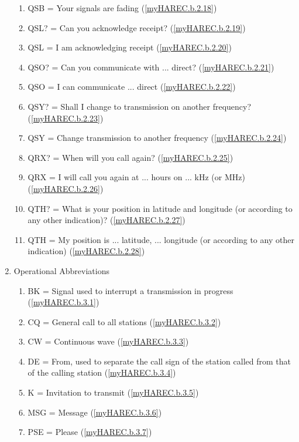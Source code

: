 \begin{enumerate}[noitemsep]
\begin{enumerate}[noitemsep]
\item QSB  = Your signals are fading (\ref{myHAREC.b.2.18})\label{HAREC.b.2.18}
\item QSL? = Can you acknowledge receipt? (\ref{myHAREC.b.2.19})\label{HAREC.b.2.19}
\item QSL  = I am acknowledging receipt (\ref{myHAREC.b.2.20})\label{HAREC.b.2.20}
\item QSO? = Can you communicate with ... direct? (\ref{myHAREC.b.2.21})\label{HAREC.b.2.21}
\item QSO  = I can communicate ... direct (\ref{myHAREC.b.2.22})\label{HAREC.b.2.22}
\item QSY? = Shall I change to transmission on another frequency? (\ref{myHAREC.b.2.23})\label{HAREC.b.2.23}
\item QSY  = Change transmission to another frequency (\ref{myHAREC.b.2.24})\label{HAREC.b.2.24}
\item QRX? = When will you call again? (\ref{myHAREC.b.2.25})\label{HAREC.b.2.25}
\item QRX  = I will call you again at ... hours on ... kHz (or MHz) (\ref{myHAREC.b.2.26})\label{HAREC.b.2.26}
\item QTH? = What is your position in latitude and longitude (or according to any other indication)? (\ref{myHAREC.b.2.27})\label{HAREC.b.2.27}
\item QTH  = My position is  ... latitude, ... longitude (or according to any other indication) (\ref{myHAREC.b.2.28})\label{HAREC.b.2.28}
\end{enumerate}
\item Operational Abbreviations
\begin{enumerate}
\item BK = Signal used to interrupt a transmission in progress (\ref{myHAREC.b.3.1})\label{HAREC.b.3.1}
\item CQ = General call to all stations (\ref{myHAREC.b.3.2})\label{HAREC.b.3.2}
\item CW = Continuous wave (\ref{myHAREC.b.3.3})\label{HAREC.b.3.3}
\item DE = From, used to separate the call sign of the station called from that of the calling station (\ref{myHAREC.b.3.4})\label{HAREC.b.3.4}
\item K = Invitation to transmit (\ref{myHAREC.b.3.5})\label{HAREC.b.3.5}
\item MSG = Message (\ref{myHAREC.b.3.6})\label{HAREC.b.3.6}
\item PSE = Please (\ref{myHAREC.b.3.7})\label{HAREC.b.3.7}

\end{enumerate}
\end{enumerate}
